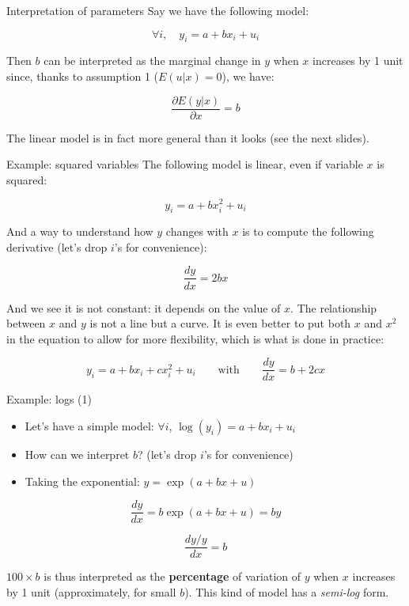 \documentclass[aspectratio=169]{beamer}
\begin{document}
\begin{frame}{Interpretation of parameters}
Say we have the following model:

\[\forall i, \quad y_i = a + bx_i + u_i\]

Then $b$ can be interpreted as the marginal change in $y$ when $x$ increases by 1 unit since, thanks to assumption 1 ($E(u|x) = 0$), we have:

\[\frac{\partial E(y|x)}{\partial x} = b\]

The linear model is in fact more general than it looks (see the next slides).
\end{frame}

\begin{frame}{Example: squared variables}
The following model is linear, even if variable $x$ is squared:

\[y_i = a + bx_i^2 + u_i\]

And a way to understand how $y$ changes with $x$ is to compute the following derivative (let's drop $i$'s for convenience):

\[\frac{dy}{dx} = 2bx\]

And we see it is not constant: it depends on the value of $x$. The relationship between $x$ and $y$ is not a line but a curve. It is even better to put both $x$ and $x^2$ in the equation to allow for more flexibility, which is what is done in practice:

\[y_i = a + bx_i + cx_i^2 + u_i \qquad \text{with} \qquad \frac{dy}{dx} = b + 2cx\]
\end{frame}

\begin{frame}{Example: logs (1)}
\begin{itemize}
    \item Let's have a simple model: $\forall i$, $\log(y_i) = a + bx_i + u_i$
    \item How can we interpret $b$? (let's drop $i$'s for convenience)
    \item Taking the exponential: $y = \exp(a + bx + u)$
\end{itemize}

\[\frac{dy}{dx} = b\exp(a + bx + u) = by\]

\[\frac{dy/y}{dx} = b\]

$100 \times b$ is thus interpreted as the \textbf{percentage} of variation of $y$ when $x$ increases by 1 unit (approximately, for small $b$). This kind of model has a \textit{semi-log} form.
\end{frame}
\end{document}
